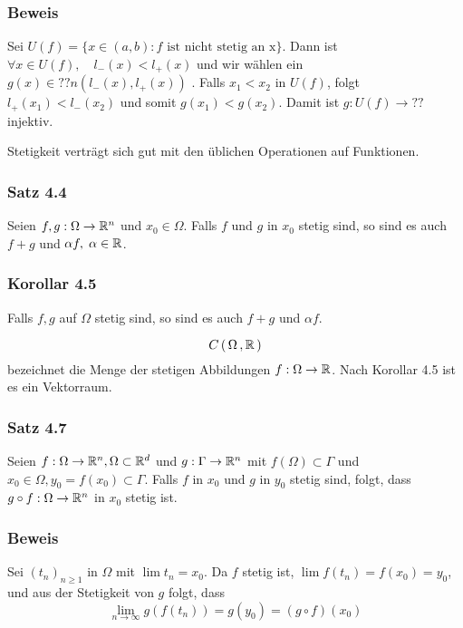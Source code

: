 \subsubsection*{Beweis}
Sei $U(f) = \{x\in(a,b):f \text{ ist nicht stetig an x}\}$. Dann ist $\forall x\in U(f), \quad l_{-}(x) < l_{+}(x)$ und wir wählen ein $g(x)\in ??n(l_{-}(x),l_{+}(x))$ .
Falls $x_{1}<x_{2}$ in $U(f)$, folgt $l_{+}(x_{1})<l_{-}(x_{2})$ und somit $g(x_{1})<g(x_{2})$. Damit ist $g:U(f)\to ??$  injektiv.

\noindent Stetigkeit verträgt sich gut mit den üblichen Operationen auf Funktionen.

\subsubsection*{Satz 4.4}
Seien $f,g:\Omega \to \mathbb{R}^{n}$ und $x_{0}\in\Omega$. Falls $f$ und $g$ in $x_{0}$ stetig sind, so sind es auch $f+g$ und $\alpha f, \; \alpha \in \mathbb{R}$.

\subsubsection*{Korollar 4.5}
Falls $f,g$ auf $\Omega$ stetig sind, so sind es auch $f+g$ und $\alpha f$.

\begin{definition}{4.6}
\[ C\,(\,\Omega\, , \mathbb{R}\,) \] bezeichnet die Menge der stetigen Abbildungen $f: \Omega\to\mathbb{R}$. Nach Korollar 4.5 ist es ein Vektorraum.
\end{definition}

\subsubsection*{Satz 4.7}
Seien $f:\Omega\to\mathbb{R}^{n}, \Omega \subset \mathbb{R}^{d}$ und $g:\Gamma \to \mathbb{R}^{n}$ mit $f(\Omega)\subset\Gamma$ und ${x_{0}\in\Omega}, {y_{0}=f(x_{0})\subset\Gamma}$. Falls $f$ in $x_{0}$ und $g$ in $y_{0}$ stetig sind, folgt, dass $g\circ f:\Omega\to\mathbb{R}^{n}$ in $x_{0}$ stetig ist.

\subsubsection*{Beweis}
Sei $(t_{n})_{n\geq1}$ in $\Omega$ mit $\lim{t_{n}} = x_{0}$. Da $f$ stetig ist, $\lim{f(t_{n})} = f(x_{0}) = y_{0}$, und aus der Stetigkeit von $g$ folgt, dass \[ \lim_{n\to\infty}{g(f(t_{n}))} = g(y_{0}) = (g \circ f)(x_{0}) \]

